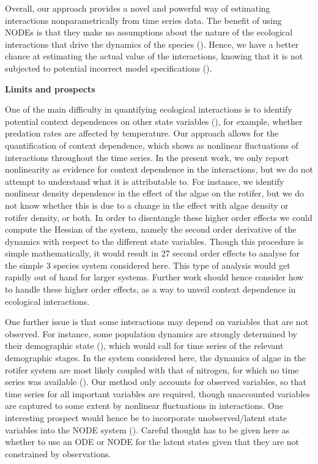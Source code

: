 \documentclass[11pt, oneside]{article}
\begin{document}
Overall, our approach provides a novel and powerful way of estimating interactions nonparametrically from time series data.
The benefit of using NODEs is that they make no assumptions about the nature of the ecological interactions that drive the dynamics of the species (\cite{Chen2018,Bonnaffe2021a}). 
Hence, we have a better chance at estimating the actual value of the interactions, knowing that it is not subjected to potential incorrect model specifications (\cite{Jost2000,Ellner2002,Wu2005,Kendall2005,Adamson2013}).

\textbf{Limits and prospects}

One of the main difficulty in quantifying ecological interactions is to identify potential context dependences on other state variables (\cite{Song2021}), for example, whether predation rates are affected by temperature.
Our approach allows for the quantification of context dependence, which shows as nonlinear fluctuations of interactions throughout the time series.
In the present work, we only report nonlinearity as evidence for context dependence in the interactions, but we do not attempt to understand what it is attributable to.
For instance, we identify nonlinear density dependence in the effect of the algae on the rotifer, but we do not know whether this is due to a change in the effect with algae density or rotifer density, or both. 
In order to disentangle these higher order effects we could compute the Hessian of the system, namely the second order derivative of the dynamics with respect to the different state variables. 
Though this procedure is simple mathematically, it would result in 27 second order effects to analyse for the simple 3 species system considered here.
This type of analysis would get rapidly out of hand for larger systems.
Further work should hence consider how to handle these higher order effects, as a way to unveil context dependence in ecological interactions. 

One further issue is that some interactions may depend on variables that are not observed.
For instance, some population dynamics are strongly determined by their demographic state (\cite{Lande2002,Coulson2004}), which would call for time series of the relevant demographic stages.
In the system considered here, the dynamics of algae in the rotifer system are most likely coupled with that of nitrogen, for which no time series was available (\cite{Hiltunen2013}).
Our method only accounts for observed variables, so that time series for all important variables are required, though unaccounted variables are captured to some extent by nonlinear fluctuations in interactions.
One interesting prospect would hence be to incorporate unobserved/latent state variables into the NODE system (\cite{Dupont2019,Zhang2019,Frank2022}).
Careful thought has to be given here as whether to use an ODE or NODE for the latent states given that they are not constrained by observations. 
\end{document}
